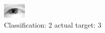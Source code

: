 \begin{figure}[h!]
\begin{center}
\includegraphics[width=0.60\columnwidth]{figures/ID2394_class_2_target_3.png}
\end{center}
\caption{ Classification: 2 actual target: 3}
\label{fig:ID2394_class_2_target_3}
\end{figure}
